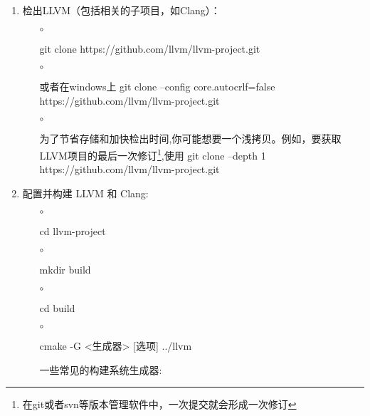 \begin{enumerate}
	\item \par{检出LLVM（包括相关的子项目，如Clang）：}   
		\begin{itemize}
			\item [$\circ$] \par{git clone https://github.com/llvm/llvm-project.git}
			\item [$\circ$] \par{或者在windows上 git clone --config core.autocrlf=false https://github.com/llvm/llvm-project.git} 

		       \item [$\circ$] \par{为了节省存储和加快检出时间,你可能想要一个浅拷贝。例如，要获取LLVM项目的最后一次修订\footnote{在git或者svn等版本管理软件中，一次提交就会形成一次修订},使用 git clone --depth 1 https://github.com/llvm/llvm-project.git} 

		\end{itemize}

	\item \par{配置并构建 LLVM 和 Clang:}   
		\begin{itemize}
			\item [$\circ$] \par{cd llvm-project}
			\item [$\circ$] \par{mkdir build}
			\item [$\circ$] \par{cd build}
			\item [$\circ$] \par{cmake -G <生成器> [选项] ../llvm}
				\par{一些常见的构建系统生成器:}
			        \begin{itemize}


\end{itemize}
\end{itemize}
\end{enumerate}
